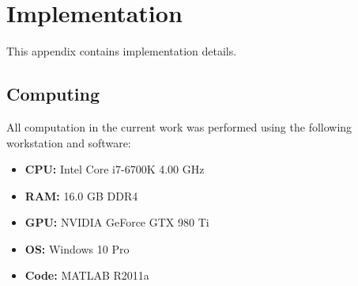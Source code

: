 \chapter{Implementation}
This appendix contains implementation details.
\section{Computing}
All computation in the current work was performed using the following workstation and software:
\begin{itemize}[topsep=0pt,itemsep=-6pt]
  \item \textbf{CPU:} Intel Core i7-6700K 4.00 GHz
  \item \textbf{RAM:} 16.0 GB DDR4
  \item \textbf{GPU:} NVIDIA GeForce GTX 980 Ti
  \item \textbf{OS:} Windows 10 Pro
  \item \textbf{Code:} MATLAB R2011a
\end{itemize}
